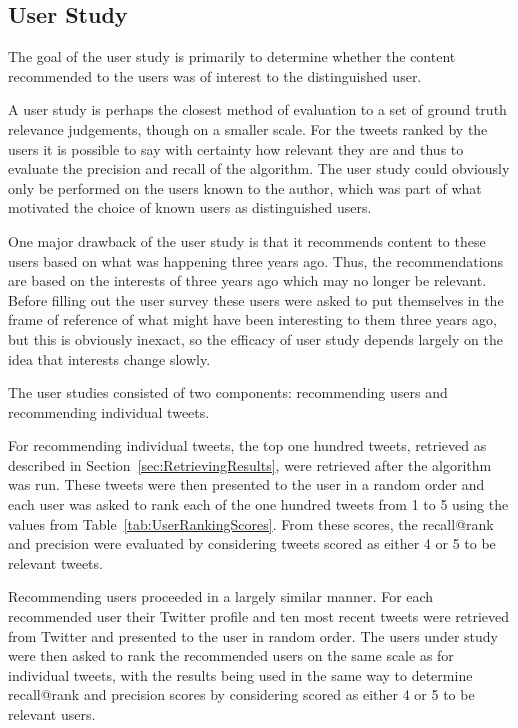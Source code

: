 \subsection{User Study}
\label{sec:UserStudy}

The goal of the user study is primarily to determine whether the content recommended to the users was of interest to the distinguished user.

A user study is perhaps the closest method of evaluation to a set of ground truth relevance judgements, though on a smaller scale. For the tweets ranked by the users it is possible to say with certainty how relevant they are and thus to evaluate the precision and recall of the algorithm. The user study could obviously only be performed on the users known to the author, which was part of what motivated the choice of known users as distinguished users.

One major drawback of the user study is that it recommends content to these users based on what was happening three years ago. Thus, the recommendations are based on the interests of three years ago which may no longer be relevant. Before filling out the user survey these users were asked to put themselves in the frame of reference of what might have been interesting to them three years ago, but this is obviously inexact, so the efficacy of user study depends largely on the idea that interests change slowly.

The user studies consisted of two components: recommending users and recommending individual tweets. 


For recommending individual tweets, the top one hundred tweets, retrieved as described in Section~\ref{sec:RetrievingResults}, were retrieved after the algorithm was run. These tweets were then presented to the user in a random order and each user was asked to rank each of the one hundred tweets from 1 to 5 using the values from Table~\ref{tab:UserRankingScores}. From these scores, the recall@rank and precision were evaluated by considering tweets scored as either 4 or 5 to be relevant tweets.


Recommending users proceeded in a largely similar manner. For each recommended user their Twitter profile and ten most recent tweets were retrieved from Twitter and presented to the user in random order. The users under study were then asked to rank the recommended users on the same scale as for individual tweets, with the results being used in the same way to determine recall@rank and precision scores by considering scored as either 4 or 5 to be relevant users.


